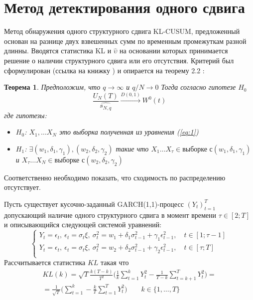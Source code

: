 \documentclass[a4paper,14pt,russian]{extarticle}
\newtheorem{thm}{Теорема}
\begin{document}
	\section{\label{sec:sec1}Метод детектирования одного сдвига}
	Метод обнаружения одного структурного сдвига KL-CUSUM, предложенный  основан на разнице двух взвешенных сумм по временным промежуткам разной длинны. Вводятся статистика KL и $\hat{\upsilon}$ на основании которых принимается решение о наличии структурного сдвига или его отсутствия. Критерий был сформулирован (ссылка на книжку ) и опирается на теорему 2.2 \cite{Kokoszka}: 
	\begin{thm}
		\label{t1}
		Предположим, что $q \to \infty$ и $q/N \to 0$ Тогда согласно гипотезе $H_0$
		\begin{equation}
			\frac{U_N(T)}{\hat{s_{N, q}}} \xrightarrow[]{D(0,1)} W^0(t)
		\end{equation}
		где гипотезы:
		\begin{itemize}
			\item $H_0$: $X_1, \dots X_N$ это выборка полученная из уравнения (\ref{eq:1})
			\item $H_1$: $\exists (w_1, \delta_1, \gamma_1), (w_2, \delta_2, \gamma_2)$ такие что $X_1 \dots X_{\tau} \in \text{выборке с} (w_1, \delta_1, \gamma_1)$ и  $X_{\tau} \dots X_{N} \in \text{выборке с} (w_2, \delta_2, \gamma_2)$
		\end{itemize}
	\end{thm}
	Соответственно необходимо показать, что сходимость по распределению отсутствует.
	\par
	Пусть существует кусочно-заданный GARCH(1,1)-процесс $(Y_t)_{t=1}^T$ допускающий наличие одного структурного сдвига в момент времени $\tau \in \left[2; T\right]$ и описывающийся следующей системой уравнений:
	\begin{equation}
		\begin{cases}
			Y_t = \epsilon_t, \ \epsilon_t = \sigma_t \xi, \ \sigma_t^2 = w_1 + \delta_1 \sigma_{t-1}^2 + \gamma_1 \epsilon_{t-1}^2, \quad t \in \left[1;\tau-1\right] \\
			Y_t = \epsilon_t, \ \epsilon_t = \sigma_t \xi, \ \sigma_t^2 = w_2 + \delta_2 \sigma_{t-1}^2 + \gamma_2 \epsilon_{t-1}^2, \quad t \in \left[\tau;T\right] \\
		\end{cases}
	\end{equation}
	Рассчитывается статистика $KL$ такая что
	\begin{multline}
		KL(k) = \sqrt{T} \frac{k (T - k)}{T^2} \Bigg( \frac{1}{k} \sum_{t=1}^{k} Y_t^2 - \frac{1}{T-k} \sum_{t=k+1}^{T}Y_t^2\Bigg) =\\
		=\frac{1}{\sqrt{T}} \Bigg(\sum_{t=1}^{k} - \frac{k}{T} \sum_{t=1}^{T} Y_t^2\Bigg) \qquad k \in \{1, \dots, T\}
	\end{multline}
\end{document}

